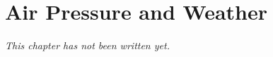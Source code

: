 \chapter{Air Pressure and Weather}\label{ch:g5:air-pressure-weather}


\emph{This chapter has not been written yet.}
